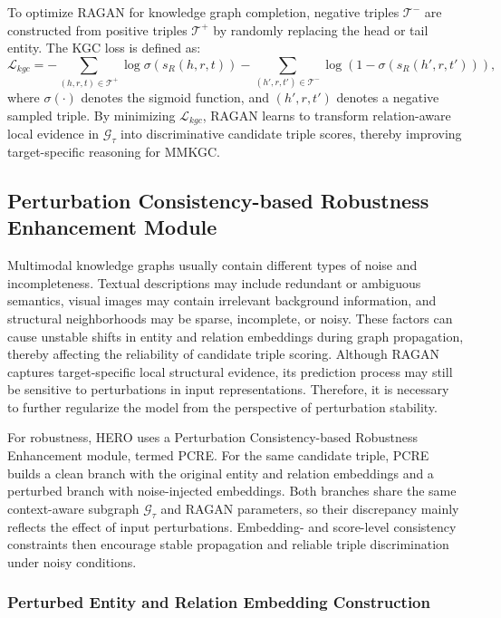 \documentclass[pdflatex,sn-mathphys-num]{sn-jnl}
\begin{document}
To optimize RAGAN for knowledge graph completion, negative triples $\mathcal{T}^{-}$ are constructed from positive triples $\mathcal{T}^{+}$ by randomly replacing the head or tail entity. The KGC loss is defined as:
\begin{equation}
\mathcal{L}_{kgc}
=
-\sum_{(h,r,t)\in\mathcal{T}^{+}}
\log
\sigma
\left(
s_{R}(h,r,t)
\right)
-
\sum_{(h',r,t')\in\mathcal{T}^{-}}
\log
\left(
1-
\sigma
\left(
s_{R}(h',r,t')
\right)
\right),
\end{equation}
where $\sigma(\cdot)$ denotes the sigmoid function, and $(h',r,t')$ denotes a negative sampled triple. By minimizing $\mathcal{L}_{kgc}$, RAGAN learns to transform relation-aware local evidence in $\mathcal{G}_{\tau}$ into discriminative candidate triple scores, thereby improving target-specific reasoning for MMKGC.

\subsection{Perturbation Consistency-based Robustness Enhancement Module}

Multimodal knowledge graphs usually contain different types of noise and incompleteness. Textual descriptions may include redundant or ambiguous semantics, visual images may contain irrelevant background information, and structural neighborhoods may be sparse, incomplete, or noisy. These factors can cause unstable shifts in entity and relation embeddings during graph propagation, thereby affecting the reliability of candidate triple scoring. Although RAGAN captures target-specific local structural evidence, its prediction process may still be sensitive to perturbations in input representations. Therefore, it is necessary to further regularize the model from the perspective of perturbation stability.

For robustness, HERO uses a Perturbation Consistency-based Robustness Enhancement module, termed PCRE. For the same candidate triple, PCRE builds a clean branch with the original entity and relation embeddings and a perturbed branch with noise-injected embeddings. Both branches share the same context-aware subgraph $\mathcal{G}_{\tau}$ and RAGAN parameters, so their discrepancy mainly reflects the effect of input perturbations. Embedding- and score-level consistency constraints then encourage stable propagation and reliable triple discrimination under noisy conditions.

\subsubsection{Perturbed Entity and Relation Embedding Construction}
\end{document}
